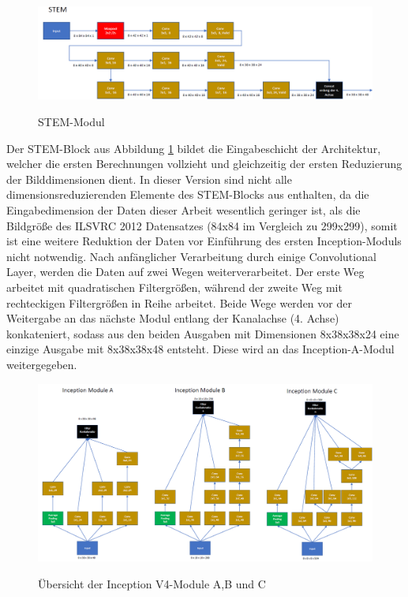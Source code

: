 \begin{figure}[H]
\centering
\caption[Caption for LOF]{STEM-Modul}
\includegraphics[angle=90, scale=0.65]{pictures/Inception/STEM}
\label{fig:stem}
\end{figure}

Der STEM-Block aus Abbildung \ref{fig:stem} bildet die Eingabeschicht der Architektur, welcher die ersten Berechnungen vollzieht und gleichzeitig der ersten Reduzierung der Bilddimensionen dient. In dieser Version sind nicht alle dimensionsreduzierenden Elemente des STEM-Blocks aus \textcite{DBLP:journals/corr/SzegedyIV16} enthalten, da die Eingabedimension der Daten dieser Arbeit wesentlich geringer ist, als die Bildgröße des ILSVRC 2012 Datensatzes (84x84 im Vergleich zu 299x299), somit ist eine weitere Reduktion der Daten vor Einführung des ersten Inception-Moduls nicht notwendig. Nach anfänglicher Verarbeitung durch einige Convolutional Layer, werden die Daten auf zwei Wegen weiterverarbeitet. Der erste Weg arbeitet mit quadratischen Filtergrößen, während der zweite Weg mit rechteckigen Filtergrößen in Reihe arbeitet. Beide Wege werden vor der Weitergabe an das nächste Modul entlang der Kanalachse (4. Achse) konkateniert, sodass aus den beiden Ausgaben mit Dimensionen 8x38x38x24 eine einzige Ausgabe mit 8x38x38x48 entsteht. Diese wird an das Inception-A-Modul weitergegeben. 

\begin{figure}[H]
\centering
\caption[Caption for LOF]{Übersicht der Inception V4-Module A,B und C}
\includegraphics[scale=0.3]{pictures/Inception/InceptionABC}
\label{fig:incmod}
\end{figure}

